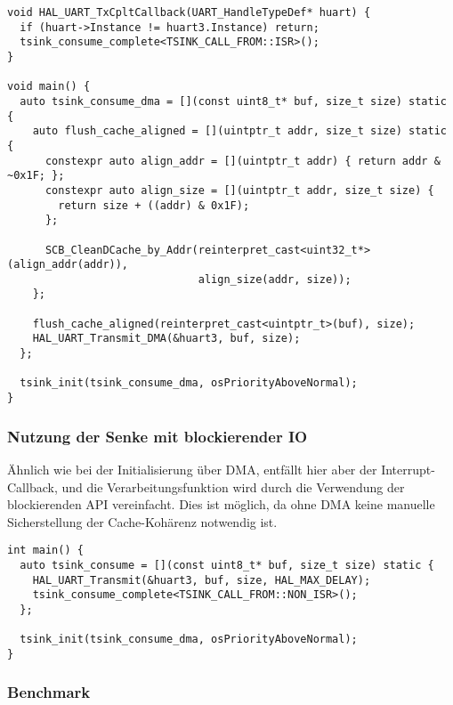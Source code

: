 \begin{code}
\begin{verbatim}
void HAL_UART_TxCpltCallback(UART_HandleTypeDef* huart) {
  if (huart->Instance != huart3.Instance) return;
  tsink_consume_complete<TSINK_CALL_FROM::ISR>();
}

void main() {
  auto tsink_consume_dma = [](const uint8_t* buf, size_t size) static {
    auto flush_cache_aligned = [](uintptr_t addr, size_t size) static {
      constexpr auto align_addr = [](uintptr_t addr) { return addr & ~0x1F; };
      constexpr auto align_size = [](uintptr_t addr, size_t size) {
        return size + ((addr) & 0x1F);
      };

      SCB_CleanDCache_by_Addr(reinterpret_cast<uint32_t*>(align_addr(addr)),
                              align_size(addr, size));
    };

    flush_cache_aligned(reinterpret_cast<uintptr_t>(buf), size);
    HAL_UART_Transmit_DMA(&huart3, buf, size);
  };

  tsink_init(tsink_consume_dma, osPriorityAboveNormal);
}
\end{verbatim}
\end{code}

\subsubsection{Nutzung der Senke mit blockierender IO}

Ähnlich wie bei der Initialisierung über DMA, entfällt hier aber der
Interrupt-Callback, und die Verarbeitungsfunktion wird durch die Verwendung der
blockierenden API vereinfacht. Dies ist möglich, da ohne DMA keine manuelle
Sicherstellung der Cache-Kohärenz notwendig ist.

\begin{code}
\begin{verbatim}
int main() {
  auto tsink_consume = [](const uint8_t* buf, size_t size) static {
    HAL_UART_Transmit(&huart3, buf, size, HAL_MAX_DELAY);
    tsink_consume_complete<TSINK_CALL_FROM::NON_ISR>();
  };

  tsink_init(tsink_consume_dma, osPriorityAboveNormal);
}
\end{verbatim}
\end{code}

\subsubsection{Benchmark}

